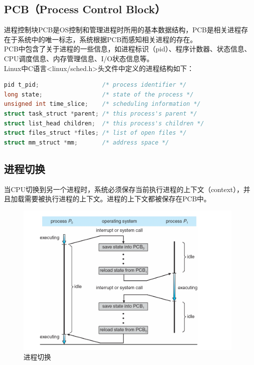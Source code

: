 \subsection{PCB（Process Control Block）}

进程控制块PCB是OS控制和管理进程时所用的基本数据结构，PCB是相关进程存在于系统中的唯一标志，系统根据PCB而感知相关进程的存在。\\

PCB中包含了关于进程的一些信息，如进程标识（pid）、程序计数器、状态信息、CPU调度信息、内存管理信息、I/O状态信息等。\\

Linux中C语言<linux/sched.h>头文件中定义的进程结构如下：\\


\begin{lstlisting}[language=C]
pid t_pid;					/* process identifier */
long state;					/* state of the process */
unsigned int time_slice;	/* scheduling information */
struct task_struct *parent;	/* this process's parent */
struct list_head children;	/* this process's children */
struct files_struct *files;	/* list of open files */
struct mm_struct *mm;		/* address space */
\end{lstlisting}

\vspace{0.5cm}

\subsection{进程切换}

当CPU切换到另一个进程时，系统必须保存当前执行进程的上下文（context），并且加载需要被执行进程的上下文。进程的上下文都被保存在PCB中。

\begin{figure}[H]
    \centering
    \includegraphics[scale=0.5]{img/C2/2-2/1.png}
    \caption{进程切换}
\end{figure}

